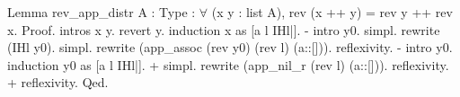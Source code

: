 Lemma rev_app_distr {A : Type} : $\forall$ (x y : list A), rev (x ++ y) = rev y ++ rev x.
Proof.
  intros x y. revert y. induction x as [a l IHl|].
  - intro y0. simpl.
    rewrite (IHl y0). simpl. rewrite (app_assoc (rev y0) (rev l) (a::[])). reflexivity.
  - intro y0. induction y0 as [a l IHl|].
    + simpl. rewrite (app_nil_r (rev l) (a::[])). reflexivity.
    + reflexivity.
Qed.
